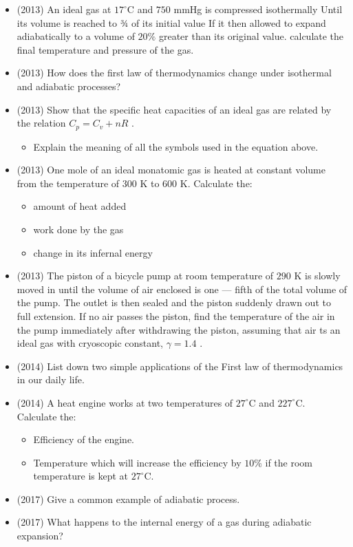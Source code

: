 \documentclass{article}
\begin{document}
\begin{itemize}
\item (2013)  An ideal gas at $ 17^{\circ}$C and $ 750$ mmHg is compressed isothermally Until its volume is reached to ¾ of its initial value If it then allowed to expand adiabatically to a volume of $ 20\%$ greater than its original value. calculate the final temperature and pressure of the gas. 
\item (2013)  How does the first law of thermodynamics change under isothermal and adiabatic processes? 
\item (2013)  Show that the specific heat capacities of an ideal gas are related by the relation $ C_{p}=C_{v}+nR$ .
 \begin{itemize}
\item Explain the meaning of all the symbols used in the equation above.
\end{itemize}
\item (2013)  One mole of an ideal monatomic gas is heated at constant volume from the temperature of $ 300$ K to $ 600$ K. Calculate the:
 \begin{itemize}
\item amount of heat added 
\item work done by the gas 
\item change in its infernal energy
\end{itemize}
\item (2013)  The piston of a bicycle pump at room temperature of $ 290$ K is slowly moved in until the volume of air enclosed is one — fifth of the total volume of the pump. The outlet is then sealed and the piston suddenly drawn out to full extension. If no air passes the piston, find the temperature of the air in the pump immediately after withdrawing the piston, assuming that air ts an ideal gas with cryoscopic constant, $ \gamma =1.4$ .
\item (2014)  List down two simple applications of the First law of thermodynamics in our daily life.
\item (2014)  A heat engine works at two temperatures of $ 27^{\circ}$C and $ 227^{\circ}$C. Calculate the:
 \begin{itemize}
\item Efficiency of the engine. 
\item Temperature which will increase the efficiency by $ 10\%$ if the room temperature is kept at $ 27^{\circ}$C. 
\end{itemize}
\item (2017)  Give a common example of adiabatic process. 
\item (2017)  What happens to the internal energy of a gas during adiabatic expansion?

\end{itemize}
\end{document}
